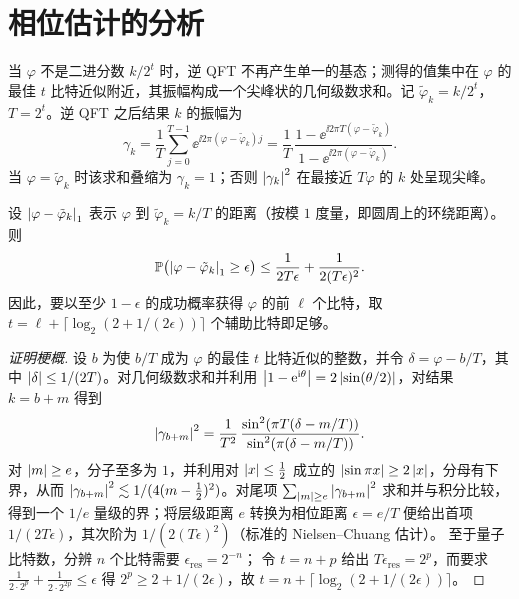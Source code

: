 \section{相位估计的分析}
\label{sec:lec04-4}

当 $\varphi$ 不是二进分数 $k/2^{t}$ 时，逆 QFT 不再产生单一的基态；测得的值集中在
$\varphi$ 的最佳 $t$ 比特近似附近，其振幅构成一个尖峰状的几何级数求和。记
$\tilde\varphi_k=k/2^{t}$，$T=2^{t}$。逆 QFT 之后结果 $k$ 的振幅为
\[
  \gamma_k=\frac{1}{T}\sum_{j=0}^{T-1}\ee^{\ii 2\pi(\varphi-\tilde\varphi_k)j}
          =\frac{1}{T}\,
           \frac{1-\ee^{\ii 2\pi T(\varphi-\tilde\varphi_k)}}
                {1-\ee^{\ii 2\pi(\varphi-\tilde\varphi_k)}}.
\]
当 $\varphi=\tilde\varphi_k$ 时该求和叠缩为 $\gamma_k=1$；否则
$\left\lvert \gamma_k \right\rvert^{2}$ 在最接近 $T\varphi$ 的 $k$ 处呈现尖峰。

\begin{theorem}[精度界与量子比特数]
\label{thm:lec04-precision}
设 $\left\lvert \varphi-\tilde\varphi_k \right\rvert_1$ 表示 $\varphi$ 到
$\tilde\varphi_k=k/T$ 的距离（按模 $1$ 度量，即圆周上的环绕距离）。则
\[
  \mathbb{P}\bigl(\left\lvert \varphi-\tilde\varphi_k \right\rvert_1\ge\epsilon\bigr)
  \le\frac{1}{2T\epsilon}+\frac{1}{2(T\epsilon)^{2}}.
\]
因此，要以至少 $1-\epsilon$ 的成功概率获得 $\varphi$ 的前 $\ell$ 个比特，取
$t=\ell+\lceil\log_2(2+1/(2\epsilon))\rceil$ 个辅助比特即足够。
\end{theorem}

\begin{proof}[证明梗概]
设 $b$ 为使 $b/T$ 成为 $\varphi$ 的最佳 $t$ 比特近似的整数，并令
$\delta=\varphi-b/T$，其中 $\left\lvert \delta \right\rvert\le 1/(2T)$。对几何级数求和并利用
$\left\lvert 1-\mathrm{e}^{\mathrm{i}\theta} \right\rvert=2\left\lvert \sin(\theta/2) \right\rvert$，对结果 $k=b+m$ 得到
\[
  \left\lvert \gamma_{b+m} \right\rvert^{2}
   =\frac{1}{T^{2}}\,
     \frac{\sin^{2}(\pi T(\delta-m/T))}{\sin^{2}(\pi(\delta-m/T))}.
\]
对 $\left\lvert m \right\rvert\ge e$，分子至多为 $1$，并利用对 $\left\lvert x \right\rvert\le\tfrac12$ 成立的
$\left\lvert \sin\pi x \right\rvert\ge2\left\lvert x \right\rvert$，分母有下界，从而
$\left\lvert \gamma_{b+m} \right\rvert^{2}\lesssim 1/(4(m-\tfrac12)^{2})$。对尾项
$\sum_{\left\lvert m \right\rvert\ge e}\left\lvert \gamma_{b+m} \right\rvert^{2}$ 求和并与积分比较，得到一个
$1/e$ 量级的界；将层级距离 $e$ 转换为相位距离
$\epsilon=e/T$ 便给出首项 $1/(2T\epsilon)$，其次阶为
$1/(2(T\epsilon)^{2})$（标准的 Nielsen--Chuang 估计）。
至于量子比特数，分辨 $n$ 个比特需要 $\epsilon_{\mathrm{res}}=2^{-n}$；
令 $t=n+p$ 给出 $T\epsilon_{\mathrm{res}}=2^{p}$，而要求
$\tfrac{1}{2\cdot2^{p}}+\tfrac{1}{2\cdot2^{2p}}\le\epsilon$ 得
$2^{p}\ge2+1/(2\epsilon)$，故 $t=n+\lceil\log_2(2+1/(2\epsilon))\rceil$。
\end{proof}

